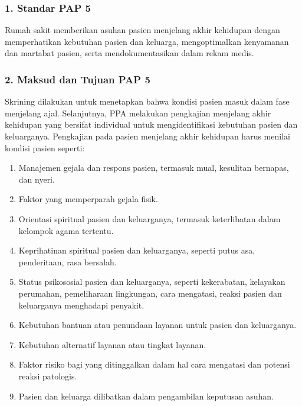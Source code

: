 \documentclass[
]{book}
\providecommand{\tightlist}{%
  \setlength{\itemsep}{0pt}\setlength{\parskip}{0pt}}
\begin{document}
\hypertarget{standar-pap-5}{%
\subsubsection*{1. Standar PAP 5}\label{standar-pap-5}}

Rumah sakit memberikan asuhan pasien menjelang akhir kehidupan dengan memperhatikan kebutuhan pasien dan keluarga, mengoptimalkan kenyamanan dan martabat pasien, serta mendokumentasikan dalam rekam medis.

\hypertarget{maksud-dan-tujuan-pap-5}{%
\subsubsection*{2. Maksud dan Tujuan PAP 5}\label{maksud-dan-tujuan-pap-5}}

Skrining dilakukan untuk menetapkan bahwa kondisi pasien masuk dalam fase menjelang ajal. Selanjutnya, PPA melakukan pengkajian menjelang akhir kehidupan yang bersifat individual untuk mengidentifikasi kebutuhan pasien dan keluarganya.
Pengkajian pada pasien menjelang akhir kehidupan harus menilai kondisi pasien seperti:

\begin{enumerate}
\def\labelenumi{\arabic{enumi}.}
\tightlist
\item
  Manajemen gejala dan respons pasien, termasuk mual, kesulitan bernapas, dan nyeri.
\item
  Faktor yang memperparah gejala fisik.
\item
  Orientasi spiritual pasien dan keluarganya, termasuk keterlibatan dalam kelompok agama tertentu.
\item
  Keprihatinan spiritual pasien dan keluarganya, seperti putus asa, penderitaan, rasa bersalah.
\item
  Status psikososial pasien dan keluarganya, seperti kekerabatan, kelayakan perumahan, pemeliharaan lingkungan, cara mengatasi, reaksi pasien dan keluarganya menghadapi penyakit.
\item
  Kebutuhan bantuan atau penundaan layanan untuk pasien dan keluarganya.
\item
  Kebutuhan alternatif layanan atau tingkat layanan.
\item
  Faktor risiko bagi yang ditinggalkan dalam hal cara mengatasi dan potensi reaksi patologis.
\item
  Pasien dan keluarga dilibatkan dalam pengambilan keputusan asuhan.
\end{enumerate}
\end{document}
